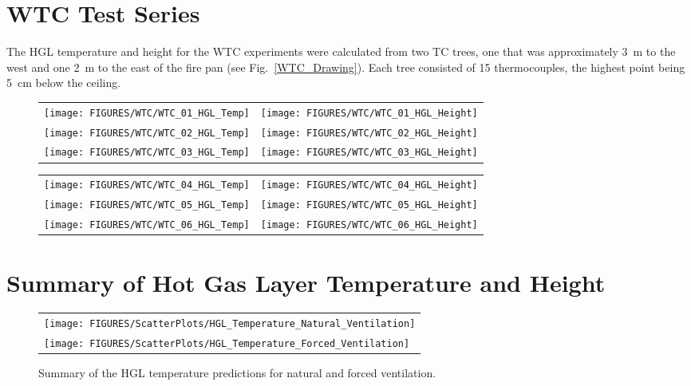 \clearpage



\section{WTC Test Series}

The HGL temperature and height for the WTC experiments were calculated from two TC trees, one that was approximately 3~m to the west and one
2~m to the east of the fire pan (see Fig.~\ref{WTC_Drawing}). Each tree consisted of 15 thermocouples, the highest point being 5~cm below the ceiling.

\begin{figure}[h!]
\begin{tabular*}{\textwidth}{l@{\extracolsep{\fill}}r}
\texttt{[image: FIGURES/WTC/WTC\_01\_HGL\_Temp]} &
\texttt{[image: FIGURES/WTC/WTC\_01\_HGL\_Height]} \\
\texttt{[image: FIGURES/WTC/WTC\_02\_HGL\_Temp]} &
\texttt{[image: FIGURES/WTC/WTC\_02\_HGL\_Height]} \\
\texttt{[image: FIGURES/WTC/WTC\_03\_HGL\_Temp]} &
\texttt{[image: FIGURES/WTC/WTC\_03\_HGL\_Height]}
\end{tabular*}
\end{figure}

\newpage

\begin{figure}[p]
\begin{tabular*}{\textwidth}{l@{\extracolsep{\fill}}r}
\texttt{[image: FIGURES/WTC/WTC\_04\_HGL\_Temp]} &
\texttt{[image: FIGURES/WTC/WTC\_04\_HGL\_Height]} \\
\texttt{[image: FIGURES/WTC/WTC\_05\_HGL\_Temp]} &
\texttt{[image: FIGURES/WTC/WTC\_05\_HGL\_Height]} \\
\texttt{[image: FIGURES/WTC/WTC\_06\_HGL\_Temp]} &
\texttt{[image: FIGURES/WTC/WTC\_06\_HGL\_Height]}
\end{tabular*}
\end{figure}

\clearpage


\section{Summary of Hot Gas Layer Temperature and Height}


\begin{figure}[h!]
\begin{center}
\begin{tabular}{l}
\texttt{[image: FIGURES/ScatterPlots/HGL\_Temperature\_Natural\_Ventilation]} \\
\texttt{[image: FIGURES/ScatterPlots/HGL\_Temperature\_Forced\_Ventilation]}
\end{tabular}
\end{center}
\caption[Summary of HGL temperature predictions for natural and forced ventilation]
{Summary of the HGL temperature predictions for natural and forced ventilation.}
\label{HGL_Summary_1}
\end{figure}


